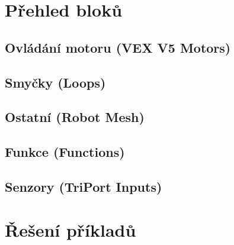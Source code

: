 \documentclass[11pt]{article}
\begin{document}
\newpage

\setcounter{secnumdepth}{3}

\newpage

\newpage

\newpage

\newpage

\newpage

\newpage

\newpage
\setcounter{secnumdepth}{0}

\newcommand{\where}[1]{{\normalfont (#1)}}

\section{Přehled bloků}

\subsection{Ovládání motoru \where{VEX V5 Motors}}
\begin{itemize}
	\blockMotorStart
	\blockMotorStop
	\blockMotorDistance
	\blockMotorVelocity
\end{itemize}

\subsection{Smyčky \where{Loops}}
\begin{itemize}
	\blockLoop
	\blockLoopForever
	\blockLoopWhile
\end{itemize}

\subsection{Ostatní \where{Robot Mesh}}
\begin{itemize}
	\blockStart
	\blockMotorDone
	\blockWait
	\blockWaitUntil
\end{itemize}

\subsection{Funkce \where{Functions}}
\begin{itemize}
	\blockFunctionDefinition
	\blockFunctionCall
\end{itemize}

\subsection{Senzory \where{TriPort Inputs}}
\begin{itemize}
	\blockBumperPressed
\end{itemize}

\newpage

\section{Řešení příkladů}\label{cha:sol}

\printsolutions

\newpage

\nocite{*}
\printbibliography[title={Zdroje a odkazy}]
\end{document}
